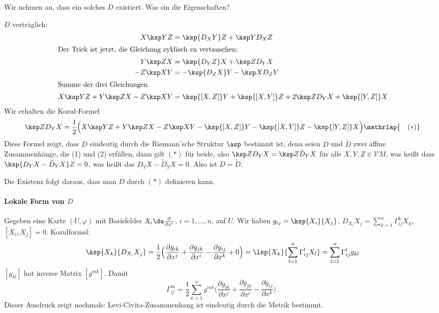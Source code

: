 \documentclass[a4paper,twoside,DIV15,BCOR12mm]{scrbook}
\newcommand{\V}{\mathcal V}
\begin{document}
\begin{beweis}
Wir nehmen an, dass ein solches $D$ existiert. Was sin die Eigenschaften?

$D$ verträglich:
\begin{align*}
X\ksp Y Z &= \ksp {D_X Y} Z  + \ksp Y {D_XZ} \\
\intertext{Der Trick ist jetzt, die Gleichung zyklisch zu vertauschen:}
Y\ksp Z X &= \ksp {D_Y Z} X  + \ksp Z {D_YX} \\
-Z\ksp X Y &= -\ksp {D_Z X} Y  - \ksp X {D_ZY} \\
\intertext{Summe der drei Gleichungen}
X \ksp Y Z + Y \ksp Z X - Z \ksp X Y &=
\ksp {[X,Z]}Y + \ksp {[X,Y]} Z + 2 \ksp Z {D_YX} + \ksp {[Y,Z]} X
\end{align*}
Wir erhalten die Kozul-Formel
\[
\ksp Z {D_YX} = \frac 12 \Big( X \ksp Y Z + Y \ksp Z X  - Z \ksp X Y -\ksp {[X,Z]}Y - \ksp {[X,Y]} Z  - \ksp {[Y,Z]} X \Big) \mathrlap{\quad (*)}
\]
Diese Formel zeigt, dass $D$ eindeutig durch die Riemann’sche Struktur $\asp$ bestimmt ist, denn seien $D$ und $\tilde D$ zwei affine Zusammenhänge, die (1) und (2) erfüllen, dann gilt $(*)$ für beide, also $\ksp Z {D_YX} = \ksp Z {\tilde D_Y X}$ für alle $X,Y,Z\in \V M$, was heißt dass $\ksp {D_YX - \tilde D_YX} Z = 0$, was heißt das $D_YX - \tilde D_YX=0$. Also ist $D=\tilde D$.

Die Existenz folgt daraus, dass man $D$ durch $(*)$ definieren kann.
\end{beweis}

\paragraph{Lokale Form von $D$} Gegeben eine Karte $(U,\varphi)$ mit Basisfelder $X_i \da \frac \partial {\partial x^i}$, $i=1,\ldots,n$, auf $U$.
Wir haben $g_{ij}=\ksp {X_i} {X_j}$, $D_{X_i}X_j = \sum_{k=1}^n \Gamma_{ij}^k X_k$, $[X_i, X_j] = 0$. Kozulformel:
\[
\ksp {X_k} {D_{X_i}X_j} = \frac 1 2 \Big( \frac {\partial g_{ik}}{\partial x^j} + \frac {\partial g_{jk}}{\partial x^i} - \frac {\partial g_{ij}}{\partial x^k} + 0 \Big) = \lsp {X_k} {\sum_{l=1}^n \Gamma_{ij}^l X_l} = \sum_{l=1}^n \Gamma_{ij}^l g_{kl}
\]
$[g_{kl}]$ hat inverse Matrix $[g^{mk}]$. Damit
\[
\Gamma_{ij}^m = \frac 1 2 \sum_{k=1}^n g^{mk} \Big( \frac {\partial g_{ik}}{\partial x^j} + \frac {\partial g_{jk}}{\partial x^i} - \frac {\partial g_{ij}}{\partial x^k} \Big)\,.
\]
Dieser Ausdruck zeigt nochmals: Levi-Civita-Zusammenhang ist eindeutig durch die Metrik bestimmt.
\end{document}
